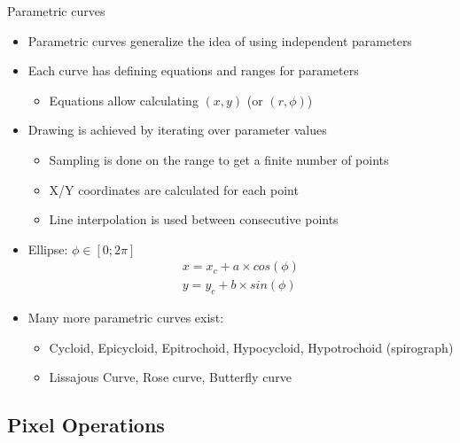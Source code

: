 \begin{frame}{Parametric curves}
  \begin{itemize}
  \item Parametric curves generalize the idea of using independent parameters
  \item Each curve has defining equations and ranges for parameters
    \begin{itemize}
    \item Equations allow calculating \((x,y)\) (or \((r,\phi)\))
    \end{itemize}
  \item Drawing is achieved by iterating over parameter values
    \begin{itemize}
    \item Sampling is done on the range to get a finite number of points
    \item X/Y coordinates are calculated for each point
    \item Line interpolation is used between consecutive points
    \end{itemize}
  \item Ellipse: \(\phi \in [0;2\pi]\)
\begin{gather*}
x = x_c + a \times cos(\phi)\\
y = y_c + b \times sin(\phi)
\end{gather*}
  \item Many more parametric curves exist:
    \begin{itemize}
    \item Cycloid, Epicycloid, Epitrochoid, Hypocycloid, Hypotrochoid (spirograph)
    \item Lissajous Curve, Rose curve, Butterfly curve
    \end{itemize}
  \end{itemize}
\end{frame}

\subsection{Pixel Operations}

